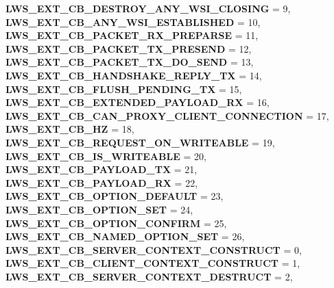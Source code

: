 \begin{DoxyCompactItemize}
{\bfseries L\+W\+S\+\_\+\+E\+X\+T\+\_\+\+C\+B\+\_\+\+D\+E\+S\+T\+R\+O\+Y\+\_\+\+A\+N\+Y\+\_\+\+W\+S\+I\+\_\+\+C\+L\+O\+S\+I\+NG} = 9, 
\newline
{\bfseries L\+W\+S\+\_\+\+E\+X\+T\+\_\+\+C\+B\+\_\+\+A\+N\+Y\+\_\+\+W\+S\+I\+\_\+\+E\+S\+T\+A\+B\+L\+I\+S\+H\+ED} = 10, 
{\bfseries L\+W\+S\+\_\+\+E\+X\+T\+\_\+\+C\+B\+\_\+\+P\+A\+C\+K\+E\+T\+\_\+\+R\+X\+\_\+\+P\+R\+E\+P\+A\+R\+SE} = 11, 
{\bfseries L\+W\+S\+\_\+\+E\+X\+T\+\_\+\+C\+B\+\_\+\+P\+A\+C\+K\+E\+T\+\_\+\+T\+X\+\_\+\+P\+R\+E\+S\+E\+ND} = 12, 
{\bfseries L\+W\+S\+\_\+\+E\+X\+T\+\_\+\+C\+B\+\_\+\+P\+A\+C\+K\+E\+T\+\_\+\+T\+X\+\_\+\+D\+O\+\_\+\+S\+E\+ND} = 13, 
\newline
{\bfseries L\+W\+S\+\_\+\+E\+X\+T\+\_\+\+C\+B\+\_\+\+H\+A\+N\+D\+S\+H\+A\+K\+E\+\_\+\+R\+E\+P\+L\+Y\+\_\+\+TX} = 14, 
{\bfseries L\+W\+S\+\_\+\+E\+X\+T\+\_\+\+C\+B\+\_\+\+F\+L\+U\+S\+H\+\_\+\+P\+E\+N\+D\+I\+N\+G\+\_\+\+TX} = 15, 
{\bfseries L\+W\+S\+\_\+\+E\+X\+T\+\_\+\+C\+B\+\_\+\+E\+X\+T\+E\+N\+D\+E\+D\+\_\+\+P\+A\+Y\+L\+O\+A\+D\+\_\+\+RX} = 16, 
{\bfseries L\+W\+S\+\_\+\+E\+X\+T\+\_\+\+C\+B\+\_\+\+C\+A\+N\+\_\+\+P\+R\+O\+X\+Y\+\_\+\+C\+L\+I\+E\+N\+T\+\_\+\+C\+O\+N\+N\+E\+C\+T\+I\+ON} = 17, 
\newline
{\bfseries L\+W\+S\+\_\+\+E\+X\+T\+\_\+\+C\+B\+\_\+HZ} = 18, 
{\bfseries L\+W\+S\+\_\+\+E\+X\+T\+\_\+\+C\+B\+\_\+\+R\+E\+Q\+U\+E\+S\+T\+\_\+\+O\+N\+\_\+\+W\+R\+I\+T\+E\+A\+B\+LE} = 19, 
{\bfseries L\+W\+S\+\_\+\+E\+X\+T\+\_\+\+C\+B\+\_\+\+I\+S\+\_\+\+W\+R\+I\+T\+E\+A\+B\+LE} = 20, 
{\bfseries L\+W\+S\+\_\+\+E\+X\+T\+\_\+\+C\+B\+\_\+\+P\+A\+Y\+L\+O\+A\+D\+\_\+\+TX} = 21, 
\newline
{\bfseries L\+W\+S\+\_\+\+E\+X\+T\+\_\+\+C\+B\+\_\+\+P\+A\+Y\+L\+O\+A\+D\+\_\+\+RX} = 22, 
{\bfseries L\+W\+S\+\_\+\+E\+X\+T\+\_\+\+C\+B\+\_\+\+O\+P\+T\+I\+O\+N\+\_\+\+D\+E\+F\+A\+U\+LT} = 23, 
{\bfseries L\+W\+S\+\_\+\+E\+X\+T\+\_\+\+C\+B\+\_\+\+O\+P\+T\+I\+O\+N\+\_\+\+S\+ET} = 24, 
{\bfseries L\+W\+S\+\_\+\+E\+X\+T\+\_\+\+C\+B\+\_\+\+O\+P\+T\+I\+O\+N\+\_\+\+C\+O\+N\+F\+I\+RM} = 25, 
\newline
{\bfseries L\+W\+S\+\_\+\+E\+X\+T\+\_\+\+C\+B\+\_\+\+N\+A\+M\+E\+D\+\_\+\+O\+P\+T\+I\+O\+N\+\_\+\+S\+ET} = 26, 
{\bfseries L\+W\+S\+\_\+\+E\+X\+T\+\_\+\+C\+B\+\_\+\+S\+E\+R\+V\+E\+R\+\_\+\+C\+O\+N\+T\+E\+X\+T\+\_\+\+C\+O\+N\+S\+T\+R\+U\+CT} = 0, 
{\bfseries L\+W\+S\+\_\+\+E\+X\+T\+\_\+\+C\+B\+\_\+\+C\+L\+I\+E\+N\+T\+\_\+\+C\+O\+N\+T\+E\+X\+T\+\_\+\+C\+O\+N\+S\+T\+R\+U\+CT} = 1, 
{\bfseries L\+W\+S\+\_\+\+E\+X\+T\+\_\+\+C\+B\+\_\+\+S\+E\+R\+V\+E\+R\+\_\+\+C\+O\+N\+T\+E\+X\+T\+\_\+\+D\+E\+S\+T\+R\+U\+CT} = 2, 

\end{DoxyCompactItemize}
